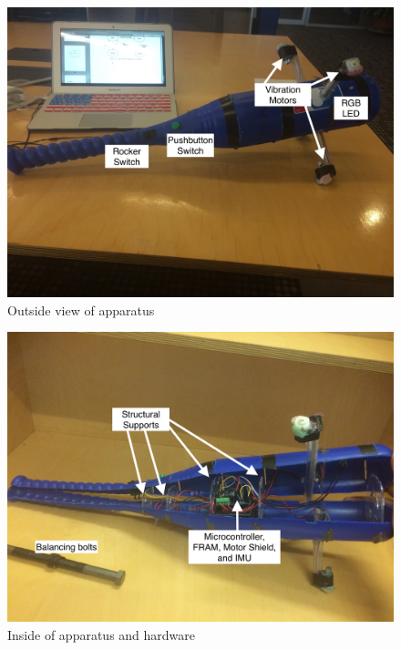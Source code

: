 \begin{figure}[htp]
\begin{center}
\vspace{0.4in}
\includegraphics[scale = .12]{bat_front.jpg}
\caption{Outside view of apparatus}
\label{fig:bat_front}
\end{center}
\end{figure}

\begin{figure}[htp]
\begin{center}
\vspace{0.4in}
\includegraphics[scale = .12]{bat_inside.jpg}
\caption{Inside of apparatus and hardware}
\label{fig:bat_inside}
\end{center}
\end{figure}
\clearpage
\newpage
